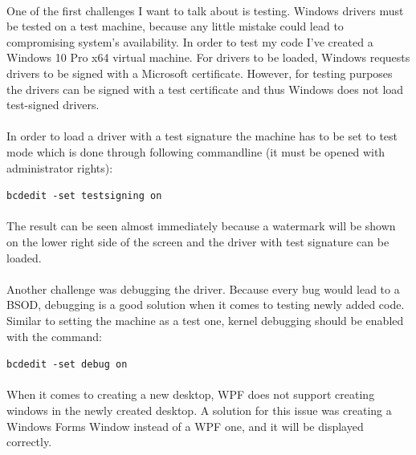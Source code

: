 		\paragraph{}
		One of the first challenges I want to talk about is testing. Windows drivers must be tested on a test machine, because any little mistake could lead to compromising system's availability. In order to test my code I've created a Windows 10 Pro x64 virtual machine. For drivers to be loaded, Windows requests drivers to be signed with a Microsoft certificate. However, for testing purposes the drivers can be signed with a test certificate and thus Windows does not load test-signed drivers. 
		
		\paragraph{}
		In order to load a driver with a test signature the machine has to be set to test mode which is done through following commandline (it must be opened with administrator rights):
		
		\bigskip
		\centerline {\texttt{bcdedit -set testsigning on}}
		\bigskip
		
		\paragraph{}
		The result can be seen almost immediately because a watermark will be shown on the lower right side of the screen and the driver with test signature can be loaded.
		
		\paragraph{}
		Another challenge was debugging the driver. Because every bug would lead to a BSOD, debugging is a good solution when it comes to testing newly added code. Similar to setting the machine as a test one, kernel debugging should be enabled with the command:
		
		\bigskip
		\centerline {\texttt{bcdedit -set debug on}}
		\bigskip
		
		\paragraph{}
		 When it comes to creating a new desktop, WPF does not support creating windows in the newly created desktop. A solution for this issue was creating a Windows Forms Window instead of a WPF one, and it will be displayed correctly.
		
